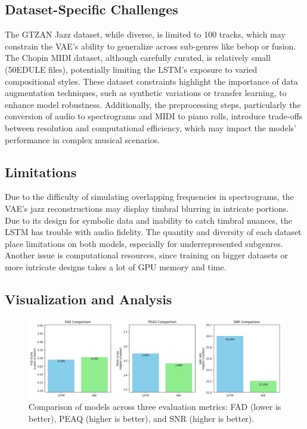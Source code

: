 \documentclass[conference]{IEEEtran}
\begin{document}
\subsection{Dataset-Specific Challenges}
The GTZAN Jazz dataset, while diverse, is limited to 100 tracks, which may constrain the VAE’s ability to generalize across sub-genres like bebop or fusion. The Chopin MIDI dataset, although carefully curated, is relatively small (50EDULE files), potentially limiting the LSTM’s exposure to varied compositional styles. These dataset constraints highlight the importance of data augmentation techniques, such as synthetic variations or transfer learning, to enhance model robustness. Additionally, the preprocessing steps, particularly the conversion of audio to spectrograms and MIDI to piano rolls, introduce trade-offs between resolution and computational efficiency, which may impact the models’ performance in complex musical scenarios.

\subsection{Limitations}
Due to the difficulty of simulating overlapping frequencies in spectrograms, the VAE's jazz reconstructions may display timbral blurring in intricate portions.  Due to its design for symbolic data and inability to catch timbral nuances, the LSTM has trouble with audio fidelity.  The quantity and diversity of each dataset place limitations on both models, especially for underrepresented subgenres.  Another issue is computational resources, since training on bigger datasets or more intricate designs takes a lot of GPU memory and time.

\subsection{Visualization and Analysis}
\begin{figure}[h]
    \centering
    \includegraphics[width=\linewidth]{metric_comparison.jpg}
    \caption{Comparison of models across three evaluation metrics: FAD (lower is better), PEAQ (higher is better), and SNR (higher is better).}
    \label{fig:metric_comparison}
\end{figure}
\end{document}
